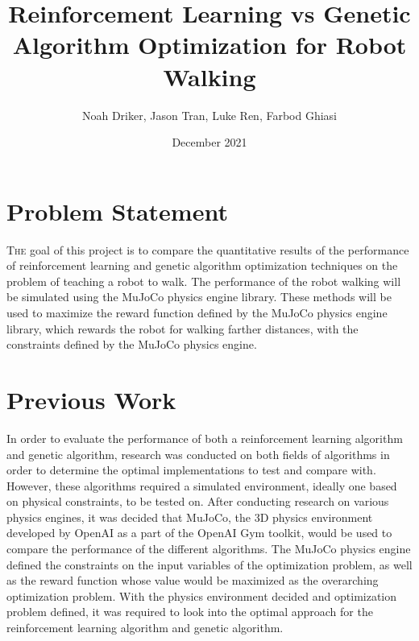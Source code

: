 \documentclass{article}
\title{Reinforcement Learning vs Genetic Algorithm Optimization for Robot Walking}
\author{Noah Driker, Jason Tran, Luke Ren, Farbod Ghiasi}
\date{December 2021}
\begin{document}
\maketitle

\section{Problem Statement}
\lettrine[lines=5]{T}{he}
     goal of this project is to compare the quantitative results of the 
performance of reinforcement learning and genetic algorithm optimization 
techniques on the problem of teaching a robot to walk. The performance of the
robot walking will be simulated using the MuJoCo physics \cite{mujoco} engine
library. These methods will be used to maximize the reward function defined 
by the MuJoCo physics engine library, which rewards the robot for walking 
farther distances, with the constraints defined by the MuJoCo physics engine.

\section{Previous Work}

    In order to evaluate the performance of both a reinforcement learning 
algorithm and genetic algorithm, research was conducted on both fields of 
algorithms in order to determine the optimal implementations to test and 
compare with. However, these algorithms required a simulated environment, 
ideally one based on physical constraints, to be tested on. After conducting 
research on various physics engines, it was decided that MuJoCo, the 3D 
physics environment developed by OpenAI as a part of the OpenAI Gym 
\cite{openaigym} toolkit, would be used to compare the  performance of the 
different algorithms. The MuJoCo physics engine defined the constraints on 
the input variables of the optimization problem, as well as the reward 
function whose value would be maximized as the 
overarching optimization problem. With the physics environment decided and 
optimization problem defined, it was required to look into the optimal 
approach for the reinforcement learning algorithm and genetic algorithm.
    
\end{document}

